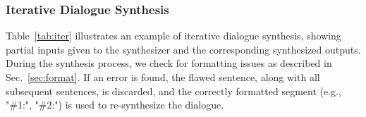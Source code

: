 


\subsubsection{Iterative Dialogue Synthesis}
Table~\ref{tab:iter} illustrates an example of iterative dialogue synthesis, showing partial inputs given to the synthesizer and the corresponding synthesized outputs. During the synthesis process, we check for formatting issues as described in Sec.~\ref{sec:format}. If an error is found, the flawed sentence, along with all subsequent sentences, is discarded, and the correctly formatted segment (e.g., "\#1:", "\#2:") is used to re-synthesize the dialogue.



